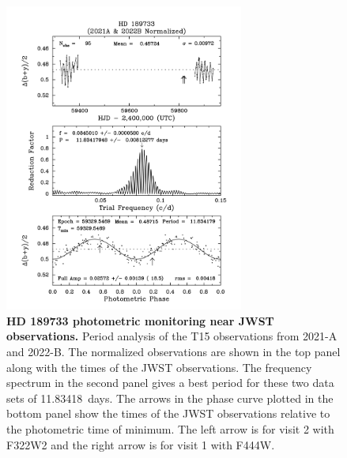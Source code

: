 \documentclass[sn-standardnature]{sn-jnl}%
\begin{document}
\begin{figure}
\centering
  \includegraphics[width=0.7\textwidth,keepaspectratio]{figs/SI_Fig7.png}
  \caption{\textbf{HD 189733 photometric monitoring near JWST observations.} Period analysis of the T15 observations from 2021-A and 2022-B. The normalized observations are shown in the top panel along with the times of the JWST observations.  The frequency spectrum in the second panel gives a best period for these two data sets of 11.83418~days.  The arrows in the phase curve plotted in the bottom panel show the times of the JWST observations relative to the photometric time of minimum. The left arrow is for visit 2 with F322W2 and the right arrow is for visit 1 with F444W.}
  \label{fig:fig3_APT}
\end{figure}
\end{document}
